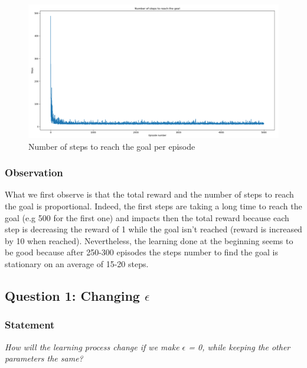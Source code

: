 \documentclass{article}
\begin{document}
\begin{figure}[H]
  \centering
  \includegraphics[scale=0.35]{fig/grid-steps.png}
  \caption{Number of steps to reach the goal per episode}
  \label{fig:grid-steps}
\end{figure}

\subsubsection{Observation} 
What we first observe is that the total reward and the number of steps to reach the goal is proportional. Indeed, the first steps are taking a long time to reach the goal (e.g 500 for the first one) and impacts then the total reward because each step is decreasing the reward of 1 while the goal isn't reached (reward is increased by 10 when reached). Nevertheless, the learning done at the beginning seems to be good because after 250-300 episodes the steps number to find the goal is stationary on an average of 15-20 steps.      

\subsection{Question 1: Changing $\epsilon$}

\subsubsection*{Statement}
\textit{How will the learning process change if we make $\epsilon$ = 0, while keeping the other parameters the same?} 
\end{document}
